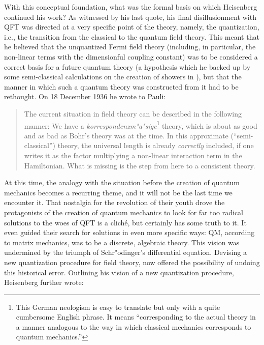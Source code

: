 \documentclass[12pt,a4paper]{article}
\begin{document}
With this conceptual foundation, what was the formal basis on which Heisenberg continued his work? As witnessed by his last quote, his final disillusionment with QFT was directed at a very specific point of the theory, namely, the quantization, i.e., the transition from the classical to the quantum field theory. This meant that he believed that the unquantized Fermi field theory (including, in particular, the non-linear terms with the dimensionful coupling constant) was to be considered a correct basis for a future quantum theory (a hypothesis which he backed up by some semi-classical calculations on the creation of showers in \citep{heisenberg_1936_zur-theorie}), but that the manner in which such a quantum theory was constructed from it had to be rethought. On 18 December 1936 he wrote to Pauli:

\begin{quote}
The current situation in field theory can be described in the following manner: We have a \emph{korrespondenzm"a"sige}\footnote{This German neologism is easy to translate but only with a quite cumbersome English phrase. It means ``corresponding to the actual theory in a manner analogous to the way in which classical mechanics corresponds to quantum mechanics.''} theory, which is about as good and as bad as Bohr's theory was at the time. In this approximate (``semi-classical'') theory, the universal length is already \emph{correctly} included, if one writes it as the factor multiplying a non-linear interaction term in the Hamiltonian. What is missing is the step from here to a consistent theory.
\end{quote}

At this time, the analogy with the situation before the creation of quantum mechanics becomes a recurring theme, and it will not be the last time we encounter it. That nostalgia for the revolution of their youth drove the protagonists of the creation of quantum mechanics to look for far too radical solutions to the woes of QFT is a clich\'e, but certainly has some truth to it. It even guided their search for solutions in even more specific ways: QM, according to matrix mechanics, was to be a discrete, algebraic theory. This vision was undermined by the triumph of Schr"odinger's differential equation. Devising a new quantization procedure for field theory, now offered the possibility of undoing this historical error. Outlining his vision of a new quantization procedure, Heisenberg further wrote:
\end{document}
